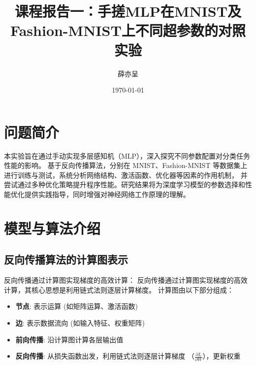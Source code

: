 \documentclass[a4paper, twocolumn]{article}
\title{课程报告一：手搓MLP在MNIST及Fashion-MNIST上不同超参数的对照实验}
\author{薛亦呈}
\date{\today}
\begin{document}
\maketitle

\section{问题简介}

本实验旨在通过手动实现多层感知机（MLP），深入探究不同参数配置对分类任务性能的影响。
基于反向传播算法，分别在 MNIST、Fashion-MNIST 等数据集上进行训练与测试，系统分析网络结构、激活函数、优化器等因素的作用机制，
并尝试通过多种优化策略提升程序性能。研究结果将为深度学习模型的参数选择和性能优化提供实践指导，同时增强对神经网络工作原理的理解。

\section{模型与算法介绍}

\subsection{反向传播算法的计算图表示}
反向传播通过计算图实现梯度的高效计算：
反向传播通过计算图实现梯度的高效计算，其核心思想是利用链式法则逐层计算梯度\cite{Goodfellow-et-al-2016}。
计算图由以下部分组成：
\begin{itemize}
    \item \textbf{节点}: 表示运算 (如矩阵运算、激活函数)
    \item \textbf{边}: 表示数据流向 (如输入特征、权重矩阵)
    \item \textbf{前向传播}: 沿计算图计算各层输出值
    \item \textbf{反向传播}: 从损失函数出发，利用链式法则逐层计算梯度 （$\frac{\partial L}{\partial W}$），更新权重
\end{itemize} 
\end{document}
